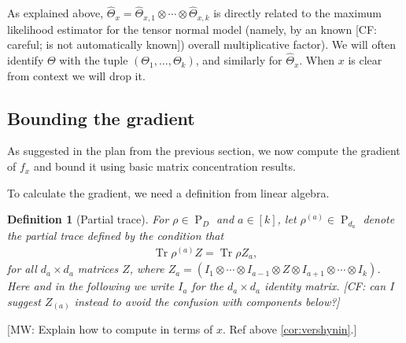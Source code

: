 \documentclass{article}
\newtheorem{definition}{Definition}
\newcommand{\ot}{\otimes}
\newcommand\PD{\operatorname{P}}
\newcommand\samp{x}
\newcommand\tr{\operatorname{Tr}}
\newcommand{\CF}[1]{{\color{purple}[CF: #1]}}
\newcommand{\MW}[1]{{\color{red}[MW: #1]}}
\begin{document}
\noindent
As explained above, $\widehat{\Theta}_{\samp} = \widehat{\Theta}_{\samp,1} \ot \cdots \ot \widehat{\Theta}_{\samp,k}$ is directly related to the maximum likelihood estimator for the tensor normal model (namely, by an known \CF{careful; is not automatically known}) overall multiplicative factor).
We will often identify $\Theta$ with the tuple $(\Theta_1,\dots,\Theta_k)$, and similarly for $\widehat{\Theta}_{\samp}$.
When $\samp$ is clear from context we will drop it.

\subsection{Bounding the gradient}
As suggested in the plan from the previous section, we now compute the gradient of $f_{\samp}$ and bound it using basic matrix concentration results.

To calculate the gradient, we need a definition from linear algebra.

\begin{definition}[Partial trace]\label{def:single marginal}
For $\rho \in \PD_D$ and $a\in[k]$, let $\rho^{(a)} \in \PD_{d_a}$ denote the \emph{partial trace} defined by the condition that
\begin{align*}
  \tr \rho^{(a)} Z = \tr \rho Z_a,
\end{align*}
for all $d_a \times d_a$ matrices $Z$, where $Z_a = (I_1 \ot \cdots \ot I_{a-1} \ot Z \ot I_{a+1} \ot \cdots \ot I_k)$.
Here and in the following we write $I_a$ for the $d_a\times d_a$ identity matrix. \CF{can I suggest $Z_{(a)}$ instead to avoid the confusion with components below?}
\end{definition}

\MW{Explain how to compute in terms of $\samp$. Ref above \cref{cor:vershynin}.}
\end{document}
